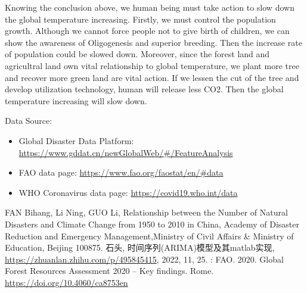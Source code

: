 \documentclass{apmcmthesis}
\begin{document}
  Knowing the conclusion above, we human being must take action to slow down the global temperature increasing.
  Firstly, we must control the population growth.
  Although we cannot force people not to give birth of children, we can show the awareness of Oligogenesis and superior breeding.
  Then the increase rate of population could be slowed down.
  Moreover, since the forest land and agricultral land own vital relationship to global temperature, we plant more tree and recover more green land are vital action.
  If we lessen the cut of the tree and develop utilization technology, human will release less CO2.
  Then the global temperature increasing will slow down.
  
  
  \newpage
  
  Data Source:
  \begin{itemize}
    \item Global Disaster Data Platform: \url{https://www.gddat.cn/newGlobalWeb/#/FeatureAnalysis}
    \item FAO data page: \url{https://www.fao.org/faostat/en/#data}
    \item WHO Coronavirus data page: \url{https://covid19.who.int/data}
  \end{itemize}
  
  \begin{thebibliography}{9}%
   FAN Bihang, Li Ning, GUO Li, Relationship between the Number of Natural Disasters and Climate Change from 1950 to 2010 in China, Academy of Disaster Reduction and Emergency Management,Ministry of Civil Affairs \& Ministry of Education, Beijing 100875.
   石头, 时间序列(ARIMA)模型及其matlab实现, \url{https://zhuanlan.zhihu.com/p/495845415}, 2022, 11, 25.
   : FAO. 2020. Global Forest Resources Assessment 2020 – Key findings. Rome. \url{https://doi.org/10.4060/ca8753en}
  \end{thebibliography}
  
  \newpage
\end{document}
